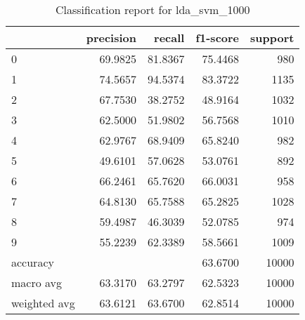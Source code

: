 \begin{table}[htb!]
\centering
\begin{tabular}{lrrrr}
    \toprule
    & precision & recall & f1-score & support \\
    \midrule
    0 & 69.9825 & 81.8367 & 75.4468 & 980 \\
    1 & 74.5657 & 94.5374 & 83.3722 & 1135 \\
    2 & 67.7530 & 38.2752 & 48.9164 & 1032 \\
    3 & 62.5000 & 51.9802 & 56.7568 & 1010 \\
    4 & 62.9767 & 68.9409 & 65.8240 & 982 \\
    5 & 49.6101 & 57.0628 & 53.0761 & 892 \\
    6 & 66.2461 & 65.7620 & 66.0031 & 958 \\
    7 & 64.8130 & 65.7588 & 65.2825 & 1028 \\
    8 & 59.4987 & 46.3039 & 52.0785 & 974 \\
    9 & 55.2239 & 62.3389 & 58.5661 & 1009 \\
    accuracy & & & 63.6700 & 10000 \\
    macro avg & 63.3170 & 63.2797 & 62.5323 & 10000 \\
    weighted avg & 63.6121 & 63.6700 & 62.8514 & 10000 \\
    \bottomrule
\end{tabular}
\caption{Classification report for lda_svm_1000}
\label{tab:classification-report-lda_svm_1000}
\end{table}
